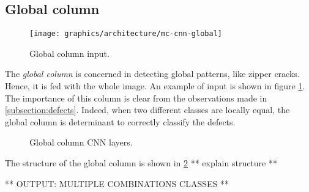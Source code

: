     \subsection{Global column}\label{section:global-column}
        \begin{figure}
            \centering
            \texttt{[image: graphics/architecture/mc-cnn-global]}
            \caption{Global column input.}\label{fig:mc-cnn:global-input}
        \end{figure}
        \par{
            The \emph{global column} is concerned in detecting global patterns, like zipper cracks. Hence, it is fed with the whole image. An example of input is shown in figure \ref{fig:mc-cnn:global-input}. The importance of this column is clear from the observations made in \ref{subsection:defects}. Indeed, when two different classes are locally equal, the global column is determinant to correctly classify the defects.
        }
        \begin{figure}
            \centering
            \caption{Global column CNN layers.}\label{fig:mc-cnn:global-structure}
        \end{figure}
        \par{
            The structure of the global column is shown in \ref{fig:mc-cnn:global-structure} ** explain structure **
        }
        \par{
            ** OUTPUT: MULTIPLE COMBINATIONS CLASSES **
        }
